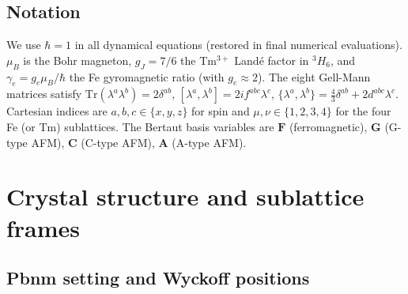 \documentclass[reprint,amsmath,amssymb,aps,prb,longbibliography]{revtex4-2}
\newcommand{\bfF}{\mathbf{F}}
\newcommand{\bfG}{\mathbf{G}}
\newcommand{\bfA}{\mathbf{A}}
\newcommand{\bfC}{\mathbf{C}}
\newcommand{\Tr}{\mathrm{Tr}}
\begin{document}
\subsection{Notation}
We use $\hbar = 1$ in all dynamical equations (restored in
final numerical evaluations). $\mu_B$ is the Bohr magneton, $g_J=7/6$ the
Tm$^{3+}$ Land\'e factor in $^3H_6$, and $\gamma_e = g_e\mu_B/\hbar$ the
Fe gyromagnetic ratio (with $g_e\approx 2$). The eight Gell-Mann matrices
satisfy $\Tr(\lambda^a\lambda^b)=2\delta^{ab}$, $[\lambda^a,\lambda^b]=
2if^{abc}\lambda^c$, $\{\lambda^a,\lambda^b\}=\frac{4}{3}\delta^{ab}+
2d^{abc}\lambda^c$. Cartesian indices are $a,b,c\in\{x,y,z\}$ for spin
and $\mu,\nu\in\{1,2,3,4\}$ for the four Fe (or Tm) sublattices. The
Bertaut basis variables are $\bfF$ (ferromagnetic), $\bfG$ (G-type AFM),
$\bfC$ (C-type AFM), $\bfA$ (A-type AFM).

\section{Crystal structure and sublattice frames}
\label{sec:crystal}

\subsection{Pbnm setting and Wyckoff positions}
\end{document}
